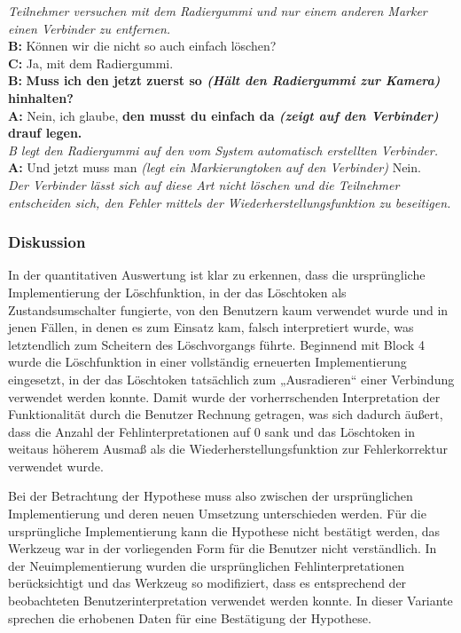 \begin{transkript}
	\emph{Teilnehmer versuchen mit dem Radiergummi und nur einem anderen Marker einen Verbinder zu entfernen.}\\
	\textbf{B:} Können wir die nicht so auch einfach löschen?\\
	\textbf{C:} Ja, mit dem Radiergummi.\\
	\textbf{B:} \textbf{Muss ich den jetzt zuerst so \emph{(Hält den Radiergummi zur Kamera)} hinhalten?}\\
	\textbf{A:} Nein, ich glaube, \textbf{den musst du einfach da \emph{(zeigt auf den Verbinder)} drauf legen.}\\
	\emph{B legt den Radiergummi auf den vom System automatisch erstellten Verbinder.}\\
	\textbf{A:} Und jetzt muss man \emph{(legt ein Markierungtoken auf den Verbinder)} Nein.\\
	\emph{Der Verbinder lässt sich auf diese Art nicht löschen und die Teilnehmer entscheiden sich, den Fehler mittels der Wiederherstellungsfunktion zu beseitigen.}
\end{transkript}

\subsubsection{Diskussion} %

In der quantitativen Auswertung ist klar zu erkennen, dass die ursprüngliche Implementierung der Löschfunktion, in der das Löschtoken als Zustandsumschalter fungierte, von den Benutzern kaum verwendet wurde und in jenen Fällen, in denen es zum Einsatz kam, falsch interpretiert wurde, was letztendlich zum Scheitern des Löschvorgangs führte. Beginnend mit Block 4 wurde die Löschfunktion in einer vollständig erneuerten Implementierung eingesetzt, in der das Löschtoken tatsächlich zum „Ausradieren“ einer Verbindung verwendet werden konnte. Damit wurde der vorherrschenden Interpretation der Funktionalität durch die Benutzer Rechnung getragen, was sich dadurch äußert, dass die Anzahl der Fehlinterpretationen auf 0 sank und das Löschtoken in weitaus höherem Ausmaß als die Wiederherstellungsfunktion zur Fehlerkorrektur verwendet wurde.

Bei der Betrachtung der Hypothese muss also zwischen der ursprünglichen Implementierung und deren neuen Umsetzung unterschieden werden. Für die ursprüngliche Implementierung kann die Hypothese nicht bestätigt werden, das Werkzeug war in der vorliegenden Form für die Benutzer nicht verständlich. In der Neuimplementierung wurden die ursprünglichen Fehlinterpretationen berücksichtigt und das Werkzeug so modifiziert, dass es entsprechend der beobachteten Benutzerinterpretation verwendet werden konnte. In dieser Variante sprechen die erhobenen Daten für eine Bestätigung der Hypothese.

